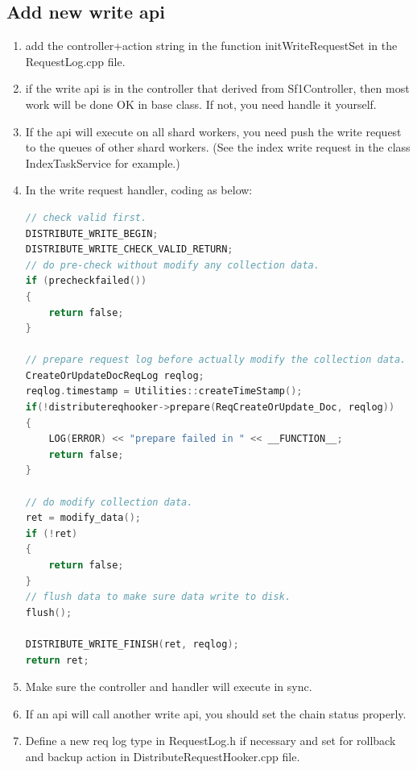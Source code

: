 \subsection{Add new write api}

\begin{enumerate}

\item add the controller+action string in the function initWriteRequestSet in the RequestLog.cpp file.
\item if the write api is in the controller that derived from Sf1Controller, then most work will be done OK in base class. If not, you need handle it yourself.
\item If the api will execute on all shard workers, you need push the write request to the queues of other shard workers. (See the index write request in the class IndexTaskService for example.)
\item In the write request handler, coding as below:
\begin{lstlisting}[language=C]
// check valid first.
DISTRIBUTE_WRITE_BEGIN;
DISTRIBUTE_WRITE_CHECK_VALID_RETURN;
// do pre-check without modify any collection data. 
if (precheckfailed())
{
    return false;
}

// prepare request log before actually modify the collection data.
CreateOrUpdateDocReqLog reqlog;
reqlog.timestamp = Utilities::createTimeStamp();
if(!distributereqhooker->prepare(ReqCreateOrUpdate_Doc, reqlog))
{
    LOG(ERROR) << "prepare failed in " << __FUNCTION__;
    return false;
}

// do modify collection data.
ret = modify_data();
if (!ret)
{
    return false;
}
// flush data to make sure data write to disk.
flush();

DISTRIBUTE_WRITE_FINISH(ret, reqlog);
return ret;
\end{lstlisting}
\item Make sure the controller and handler will execute in sync.
\item If an api will call another write api, you should set the chain status properly.
\item Define a new req log type in RequestLog.h if necessary and set for rollback and backup action in DistributeRequestHooker.cpp file.

\end{enumerate}

